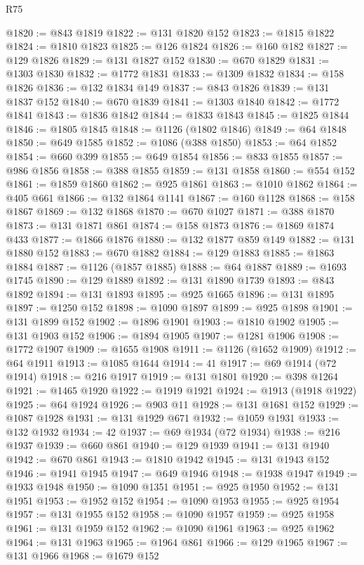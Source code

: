 \begin{lexlean}{R75}
\begin{coremodule}
@1820 := @843 @1819
@1822 := @131 @1820 @152
@1823 := @1815 @1822
@1824 := @1810 @1823
@1825 := @126 @1824
@1826 := @160 @182
@1827 := @129 @1826
@1829 := @131 @1827 @152
@1830 := @670 @1829
@1831 := @1303 @1830
@1832 := @1772 @1831
@1833 := @1309 @1832
@1834 := @158 @1826
@1836 := @132 @1834 @149
@1837 := @843 @1826
@1839 := @131 @1837 @152
@1840 := @670 @1839
@1841 := @1303 @1840
@1842 := @1772 @1841
@1843 := @1836 @1842
@1844 := @1833 @1843
@1845 := @1825 @1844
@1846 := @1805 @1845
@1848 := @1126 (@1802 @1846)
@1849 := @64 @1848
@1850 := @649 @1585
@1852 := @1086 (@388 @1850)
@1853 := @64 @1852
@1854 := @660 @399
@1855 := @649 @1854
@1856 := @833 @1855
@1857 := @986 @1856
@1858 := @388 @1855
@1859 := @131 @1858
@1860 := @554 @152
@1861 := @1859 @1860
@1862 := @925 @1861
@1863 := @1010 @1862
@1864 := @405 @661
@1866 := @132 @1864 @1141
@1867 := @160 @1128
@1868 := @158 @1867
@1869 := @132 @1868
@1870 := @670 @1027
@1871 := @388 @1870
@1873 := @131 @1871 @861
@1874 := @158 @1873
@1876 := @1869 @1874 @433
@1877 := @1866 @1876
@1880 := @132 @1877 @859 @149
@1882 := @131 @1880 @152
@1883 := @670 @1882
@1884 := @129 @1883
@1885 := @1863 @1884
@1887 := @1126 (@1857 @1885)
@1888 := @64 @1887
@1889 := @1693 @1745
@1890 := @129 @1889
@1892 := @131 @1890 @1739
@1893 := @843 @1892
@1894 := @131 @1893
@1895 := @925 @1665
@1896 := @131 @1895
@1897 := @1250 @152
@1898 := @1090 @1897
@1899 := @925 @1898
@1901 := @131 @1899 @152
@1902 := @1896 @1901
@1903 := @1810 @1902
@1905 := @131 @1903 @152
@1906 := @1894 @1905
@1907 := @1281 @1906
@1908 := @1772 @1907
@1909 := @1655 @1908
@1911 := @1126 (@1652 @1909)
@1912 := @64 @1911
@1913 := @1085 @1644
@1914 := 41
@1917 := @69 @1914 (@72 @1914)
@1918 := @216 @1917
@1919 := @131 @1801
@1920 := @398 @1264
@1921 := @1465 @1920
@1922 := @1919 @1921
@1924 := @1913 (@1918 @1922)
@1925 := @64 @1924
@1926 := @903 @11
@1928 := @131 @1681 @152
@1929 := @1087 @1928
@1931 := @131 @1929 @671
@1932 := @1059 @1931
@1933 := @132 @1932
@1934 := 42
@1937 := @69 @1934 (@72 @1934)
@1938 := @216 @1937
@1939 := @660 @861
@1940 := @129 @1939
@1941 := @131 @1940
@1942 := @670 @861
@1943 := @1810 @1942
@1945 := @131 @1943 @152
@1946 := @1941 @1945
@1947 := @649 @1946
@1948 := @1938 @1947
@1949 := @1933 @1948
@1950 := @1090 @1351
@1951 := @925 @1950
@1952 := @131 @1951
@1953 := @1952 @152
@1954 := @1090 @1953
@1955 := @925 @1954
@1957 := @131 @1955 @152
@1958 := @1090 @1957
@1959 := @925 @1958
@1961 := @131 @1959 @152
@1962 := @1090 @1961
@1963 := @925 @1962
@1964 := @131 @1963
@1965 := @1964 @861
@1966 := @129 @1965
@1967 := @131 @1966
@1968 := @1679 @152

\end{coremodule}
\end{lexlean}
